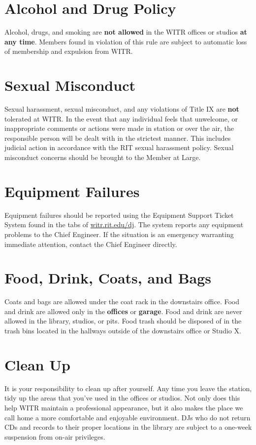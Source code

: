 \documentclass{witrman}
\begin{document}
\section{Alcohol and Drug Policy}
Alcohol, drugs, and smoking are \textbf{not allowed} in the WITR offices or
studios \textbf{at any time}. Members found in violation of this rule are
subject to automatic loss of membership and expulsion from WITR\@.

\section{Sexual Misconduct}
Sexual harassment, sexual misconduct, and any violations of Title IX are
\textbf{not} tolerated at WITR\@. In the event that any individual feels that
unwelcome, or inappropriate comments or actions were made in station or over the
air, the responsible person will be dealt with in the strictest manner. This
includes judicial action in accordance with the RIT sexual harassment policy.
Sexual misconduct concerns should be brought to the Member at Large.

\section{Equipment Failures}
Equipment failures should be reported using the Equipment Support Ticket System
found in the tabs of \href{https://witr.rit.edu/dj/}{witr.rit.edu/dj}. The
system reports any equipment problems to the Chief Engineer. If the situation is
an emergency warranting immediate attention, contact the Chief Engineer
directly.

\section{Food, Drink, Coats, and Bags}
Coats and bags are allowed under the coat rack in the downstairs office. Food
and drink are allowed only in the \textbf{offices} or \textbf{garage}. Food and
drink are never allowed in the library, studios, or pits. Food trash should be
disposed of in the trash bins located in the hallways outside of the downstairs
office or Studio X.

\section{Clean Up}
It is your responsibility to clean up after yourself. Any time you leave the
station, tidy up the areas that you've used in the offices or studios. Not only
does this help WITR maintain a professional appearance, but it also makes the
place we call home a more comfortable and enjoyable environment. DJs who do not
return CDs and records to their proper locations in the library are subject to a
one-week suspension from on-air privileges.
\end{document}
